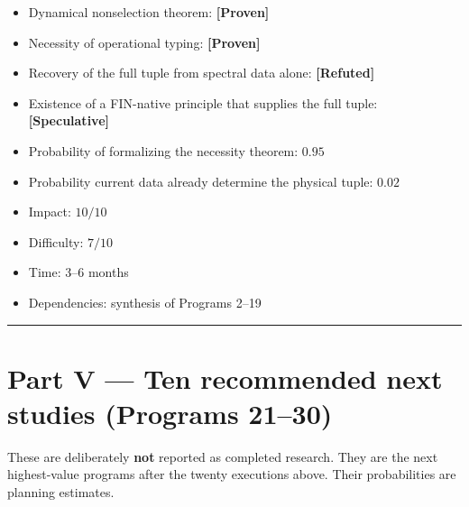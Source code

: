 \documentclass[11pt,a4paper,openany]{report}
\newcommand{\statusProven}{\textcolor{fingreen}{[Proven]}}
\newcommand{\statusSpeculative}{\textcolor{finorange}{[Speculative]}}
\newcommand{\statusRefuted}{\textcolor{finred}{[Refuted]}}
\begin{document}
\begin{itemize}
\item 
Dynamical nonselection theorem: \textbf{\statusProven{}}

\item 
Necessity of operational typing: \textbf{\statusProven{}}

\item 
Recovery of the full tuple from spectral data alone: \textbf{\statusRefuted{}}

\item 
Existence of a FIN-native principle that supplies the full tuple: \textbf{\statusSpeculative{}}

\item 
Probability of formalizing the necessity theorem: \(0.95\)

\item 
Probability current data already determine the physical tuple: \(0.02\)

\item 
Impact: \(10/10\)

\item 
Difficulty: \(7/10\)

\item 
Time: 3–6 months

\item 
Dependencies: synthesis of Programs 2–19

\end{itemize}

\par\medskip\hrule\medskip

\chapter{Part V — Ten recommended next studies (Programs 21–30)}

These are deliberately \textbf{not} reported as completed research. They are the next highest-value programs after the twenty executions above. Their probabilities are planning estimates.
\end{document}
